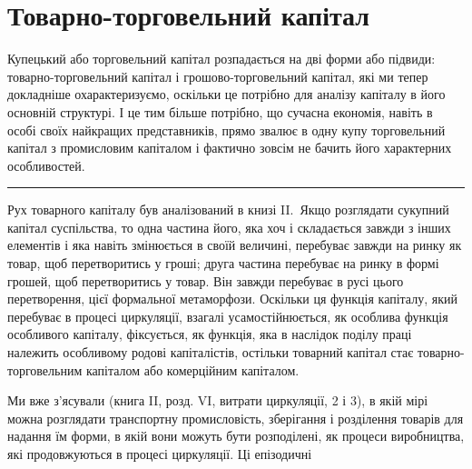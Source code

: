 


\section{Товарно-торговельний капітал}

Купецький або торговельний капітал розпадається на дві
форми або підвиди: товарно-торговельний капітал і грошово-торговельний
капітал, які ми тепер докладніше охарактеризуємо,
оскільки це потрібно для аналізу капіталу в його основній структурі.
І це тим більше потрібно, що сучасна економія, навіть
в особі своїх найкращих представників, прямо звалює в одну
купу торговельний капітал з промисловим капіталом і фактично
зовсім не бачить його характерних особливостей.

\pfbreak{}

Рух товарного капіталу був аналізований в книзі II.~Якщо
розглядати сукупний капітал суспільства, то одна частина
його, яка хоч і складається завжди з інших елементів і яка навіть
змінюється в своїй величині, перебуває завжди на ринку
як товар, щоб перетворитись у гроші; друга частина перебуває
на ринку в формі грошей, щоб перетворитись у товар. Він
завжди перебуває в русі цього перетворення, цієї формальної
метаморфози. Оскільки ця функція капіталу, який перебуває
в процесі циркуляції, взагалі усамостійнюється, як особлива
функція особливого капіталу, фіксується, як функція, яка в наслідок
поділу праці належить особливому родові капіталістів,
остільки товарний капітал стає товарно-торговельним капіталом
або комерційним капіталом.

Ми вже з’ясували (книга II, розд. VI, витрати циркуляції,
2 і 3), в якій мірі можна розглядати транспортну промисловість,
зберігання і розділення товарів для надання їм форми,
в якій вони можуть бути розподілені, як процеси виробництва,
які продовжуються в процесі циркуляції. Ці епізодичні
\parbreak{}  %
